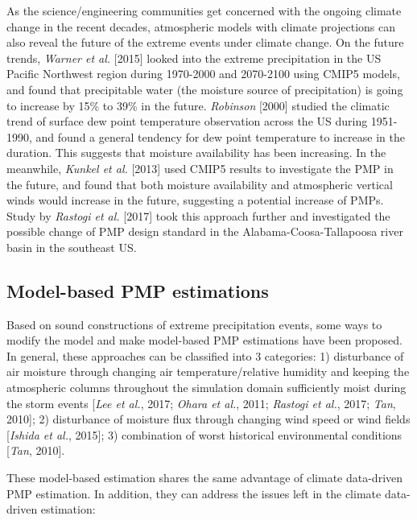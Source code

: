 As the science/engineering communities get concerned with the ongoing climate change in the recent decades, atmospheric models with climate projections can also reveal the future of the extreme events under climate change. On the future trends, \textit{Warner et al.} [2015] looked into the extreme precipitation in the US Pacific Northwest region during 1970-2000 and 2070-2100 using CMIP5 models, and found that precipitable water (the moisture source of precipitation) is going to increase by 15\% to 39\% in the future. \textit{Robinson} [2000] studied the climatic trend of surface dew point temperature observation across the US during 1951-1990, and found a general tendency for dew point temperature to increase in the duration. This suggests that moisture availability has been increasing. In the meanwhile, \textit{Kunkel et al.} [2013] used CMIP5 results to investigate the PMP in the future, and found that both moisture availability and atmospheric vertical winds would increase in the future, suggesting a potential increase of PMPs. Study by \textit{Rastogi et al.} [2017]  took this approach further and investigated the possible change of PMP design standard in the Alabama-Coosa-Tallapoosa river basin in the southeast US.

\subsection{Model-based PMP estimations}

Based on sound constructions of extreme precipitation events, some ways to modify the model and make model-based PMP estimations have been proposed. In general, these approaches can be classified into 3 categories: 1) disturbance of air moisture through changing air temperature/relative humidity and keeping the atmospheric columns throughout the simulation domain sufficiently moist during the storm events [\textit{Lee et al.}, 2017; \textit{Ohara et al.}, 2011; \textit{Rastogi et al.}, 2017; \textit{Tan}, 2010]; 2) disturbance of moisture flux through changing wind speed or wind fields [\textit{Ishida et al.}, 2015]; 3) combination of worst historical environmental conditions [\textit{Tan}, 2010].

These model-based estimation shares the same advantage of climate data-driven PMP estimation. In addition, they can address the issues left in the climate data-driven estimation:

